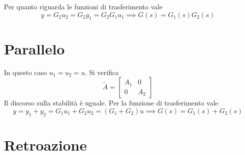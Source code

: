 Per quanto riguarda le funzioni di trasferimento vale
\begin{equation*}
	y=G_2 u_2 =G_2 y_1 =G_2 G_1 u_1 \implies \boxed{G\left(s\right) =G_1\left(s\right) G_2\left(s\right)}
\end{equation*}

\section{Parallelo}

In questo caso $u_1 =u_2 =u$. Si verifica
\begin{equation*}
	\tilde{A} =\begin{bmatrix}
	A_1 & 0\\
	0 & A_2
	\end{bmatrix}
\end{equation*}
Il discorso sulla stabilità è uguale. Per la funzione di trasferimento vale
\begin{equation*}
	y=y_1 +y_2 =G_1 u_1 +G_2 u_2 =\left(G_1 +G_2\right) u\implies \boxed{G\left(s\right) =G_1\left(s\right) +G_2\left(s\right)}
\end{equation*}

\section{Retroazione}

